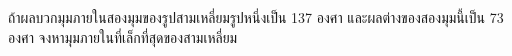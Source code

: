﻿%
\question ถ้าผลบวกมุมภายในสองมุมของรูปสามเหลี่ยมรูปหนึ่งเป็น 137 องศา และผลต่างของสองมุมนี้เป็น 73 องศา จงหามุมภายในที่เล็กที่สุดของสามเหลี่ยม
\newline
{}
